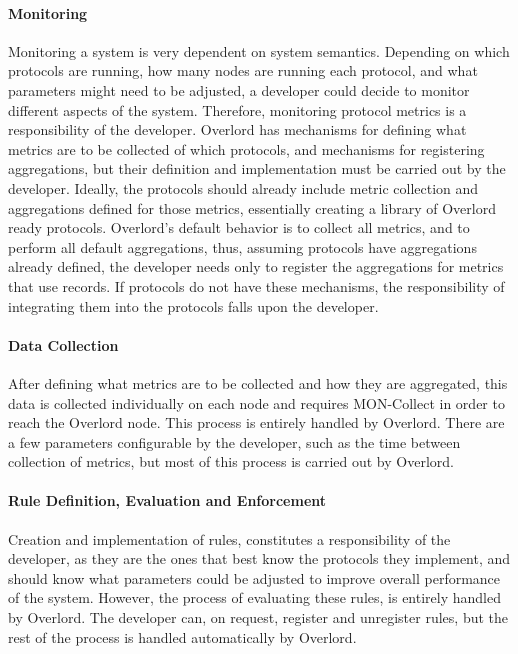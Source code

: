 \paragraph{Monitoring} Monitoring a system is very dependent on system semantics. Depending on which protocols are running, how many nodes are running each protocol, and what parameters might need to be adjusted, a developer could decide to monitor different aspects of the system. Therefore, monitoring protocol metrics is a responsibility of the developer. Overlord has mechanisms for defining what metrics are to be collected of which protocols, and mechanisms for registering aggregations, but their definition and implementation must be carried out by the developer. Ideally, the protocols should already include metric collection and aggregations defined for those metrics, essentially creating a library of Overlord ready protocols. Overlord's default behavior is to collect all metrics, and to perform all default aggregations, thus, assuming protocols have aggregations already defined, the developer needs only to register the aggregations for metrics that use records. If protocols do not have these mechanisms, the responsibility of integrating them into the protocols falls upon the developer.

\paragraph{Data Collection} After defining what metrics are to be collected and how they are aggregated, this data is collected individually on each node and requires MON-Collect in order to reach the Overlord node. This process is entirely handled by Overlord. There are a few parameters configurable by the developer, such as the time between collection of metrics, but most of this process is carried out by Overlord.

\paragraph{Rule Definition, Evaluation and Enforcement} Creation and implementation of rules, constitutes a responsibility of the developer, as they are the ones that best know the protocols they implement, and should know what parameters could be adjusted to improve overall performance of the system. However, the process of evaluating these rules, is entirely handled by Overlord. The developer can, on request, register and unregister rules, but the rest of the process is handled automatically by Overlord.

